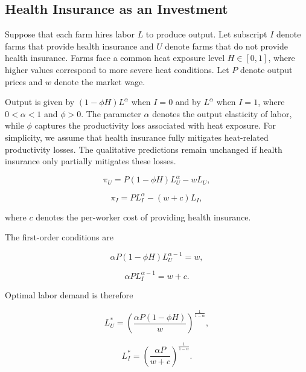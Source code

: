 \documentclass[12pt]{article}
\begin{document}
\subsection{Health Insurance as an Investment}

Suppose that each farm hires labor $L$ to produce output. Let subscript $I$ denote farms that provide health insurance and $U$ denote farms that do not provide health insurance. Farms face a common heat exposure level $H \in [0,1]$, where higher values correspond to more severe heat conditions. Let $P$ denote output prices and $w$ denote the market wage.

Output is given by $(1-\phi H)L^{\alpha}$ when $I=0$ and by $L^{\alpha}$ when $I=1$, where $0<\alpha<1$ and $\phi>0$. The parameter $\alpha$ denotes the output elasticity of labor, while $\phi$ captures the productivity loss associated with heat exposure. For simplicity, we assume that health insurance fully mitigates heat-related productivity losses. The qualitative predictions remain unchanged if health insurance only partially mitigates these losses.

\begin{equation}
\pi_U
=
P(1-\phi H)L_U^{\alpha}
-
wL_U,
\end{equation}

\begin{equation}
\pi_I
=
PL_I^{\alpha}
-
(w+c)L_I,
\end{equation}

where $c$ denotes the per-worker cost of providing health insurance.

The first-order conditions are

\begin{equation}
\alpha P(1-\phi H)L_U^{\alpha-1}
=
w,
\end{equation}

\begin{equation}
\alpha P L_I^{\alpha-1}
=
w+c.
\end{equation}

Optimal labor demand is therefore

\begin{equation}
L_U^*
=
\left(
\frac{\alpha P(1-\phi H)}
{w}
\right)^{\frac{1}{1-\alpha}},
\end{equation}

\begin{equation}
L_I^*
=
\left(
\frac{\alpha P}
{w+c}
\right)^{\frac{1}{1-\alpha}}.
\end{equation}
\end{document}
